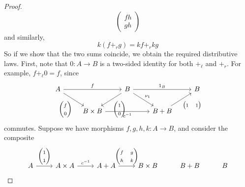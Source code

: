 \begin{proof}
\[\begin{pmatrix}
        fh \\ gh
    \end{pmatrix} \]
    and similarly,
    \[ k(f +_r g) = kf +_r kg \]
    So if we show that the two sums coincide, we obtain the required distributive laws.
    First, note that \( 0 : A \to B \) is a two-sided identity for both \( +_\ell \) and \( +_r \).
    For example, \( f +_\ell 0 = f \), since
\[\begin{tikzcd}[ampersand replacement=\&]
	A \&\& B \&\& B \\
	\& {B \times B} \&\& {B + B}
	\arrow["{\begin{pmatrix}f \\ 0\end{pmatrix}}"', from=1-1, to=2-2]
	\arrow["f", from=1-1, to=1-3]
	\arrow["{\begin{pmatrix}1\\0\end{pmatrix}}", from=1-3, to=2-2]
	\arrow["{\nu_1}", from=1-3, to=2-4]
	\arrow["{c^{-1}}"', from=2-2, to=2-4]
	\arrow["{1_B}", from=1-3, to=1-5]
	\arrow["{\begin{pmatrix}1&1\end{pmatrix}}"', from=2-4, to=1-5]
\end{tikzcd}\]
    commutes.
    Suppose we have morphisms \( f, g, h, k : A \to B \), and consider the composite
\[\begin{tikzcd}[ampersand replacement=\&]
	A \& {A \times A} \& {A + A} \& {B \times B} \& {B + B} \& B
	\arrow["{\begin{pmatrix}1\\1\end{pmatrix}}", from=1-1, to=1-2]
	\arrow["{c^{-1}}", from=1-2, to=1-3]
	\arrow["{\begin{pmatrix}f&g\\h&k\end{pmatrix}}", from=1-3, to=1-4]

\end{tikzcd}\]
\end{proof}
